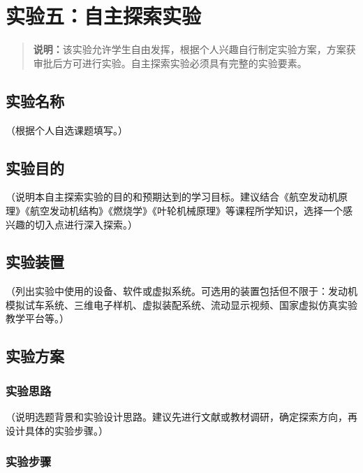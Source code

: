 \section{实验五：自主探索实验}

\begin{quote}
\textbf{说明：}该实验允许学生自由发挥，根据个人兴趣自行制定实验方案，方案获审批后方可进行实验。自主探索实验必须具有完整的实验要素。
\end{quote}

\subsection{实验名称}

（根据个人自选课题填写。）

\subsection{实验目的}

（说明本自主探索实验的目的和预期达到的学习目标。建议结合《航空发动机原理》《航空发动机结构》《燃烧学》《叶轮机械原理》等课程所学知识，选择一个感兴趣的切入点进行深入探索。）

\subsection{实验装置}

（列出实验中使用的设备、软件或虚拟系统。可选用的装置包括但不限于：发动机模拟试车系统、三维电子样机、虚拟装配系统、流动显示视频、国家虚拟仿真实验教学平台等。）

\subsection{实验方案}

\subsubsection{实验思路}

（说明选题背景和实验设计思路。建议先进行文献或教材调研，确定探索方向，再设计具体的实验步骤。）

\subsubsection{实验步骤}

